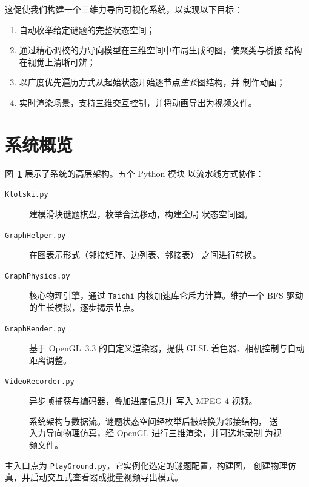 \documentclass[11pt,a4paper]{report}
\begin{document}
这促使我们构建一个三维力导向可视化系统，以实现以下目标：
\begin{enumerate}
    \item 自动枚举给定谜题的完整状态空间；
    \item 通过精心调校的力导向模型在三维空间中布局生成的图，使聚类与桥接
          结构在视觉上清晰可辨；
    \item 以广度优先遍历方式从起始状态开始逐节点\emph{生长}图结构，并
          制作动画；
    \item 实时渲染场景，支持三维交互控制，并将动画导出为视频文件。
\end{enumerate}
\section{系统概览}
\label{sec:overview}
图~\ref{fig:system-architecture} 展示了系统的高层架构。五个 Python 模块
以流水线方式协作：
\begin{description}
    \item[\texttt{Klotski.py}] 建模滑块谜题棋盘，枚举合法移动，构建全局
        状态空间图。
    \item[\texttt{GraphHelper.py}] 在图表示形式（邻接矩阵、边列表、邻接表）
        之间进行转换。
    \item[\texttt{GraphPhysics.py}] 核心物理引擎，通过 \texttt{Taichi}
        内核加速库仑斥力计算。维护一个 BFS 驱动的生长模拟，逐步揭示节点。
    \item[\texttt{GraphRender.py}] 基于 OpenGL~3.3 的自定义渲染器，提供
        GLSL 着色器、相机控制与自动距离调整。
    \item[\texttt{VideoRecorder.py}] 异步帧捕获与编码器，叠加进度信息并
        写入 MPEG-4 视频。
\end{description}
\begin{figure}[htbp]
    \centering
    \caption{系统架构与数据流。谜题状态空间经枚举后被转换为邻接结构，
             送入力导向物理仿真，经 OpenGL 进行三维渲染，并可选地录制
             为视频文件。}
    \label{fig:system-architecture}
\end{figure}
主入口点为 \texttt{PlayGround.py}，它实例化选定的谜题配置，构建图，
创建物理仿真，并启动交互式查看器或批量视频导出模式。
\end{document}

